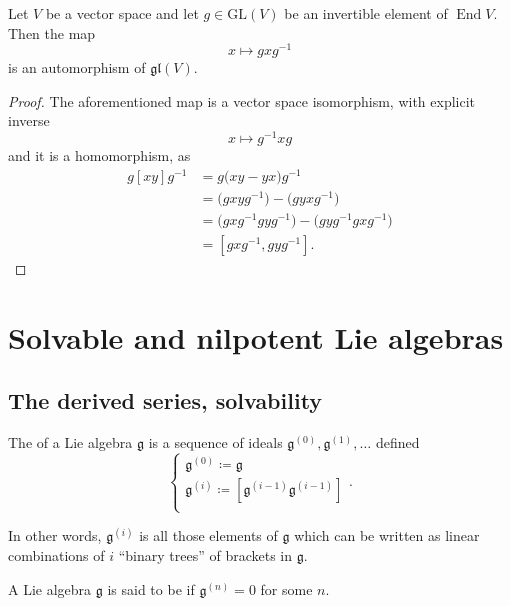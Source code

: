 \documentclass{article}
\newcommand{\lb}[1]{\ensuremath{\left[{#1}\right]}}
\DeclareMathOperator{\End}{End}
\newcommand{\frkg}{\ensuremath{\mathfrak{g}}}
\newcommand{\GL}{\ensuremath{\text{GL}}}
\newcommand{\glalg}{\ensuremath{\mathfrak{gl}}}
\begin{document}
\begin{proposition}
    Let $V$ be a vector space and let $g \in \GL(V)$ be an invertible element of $\End V$.
    Then the map
    \[
        x \mapsto gxg^{-1}
    \]
    is an automorphism of $\glalg(V)$.
\end{proposition}
\begin{proof}
    The aforementioned map is a vector space isomorphism, with explicit inverse
    \[
        x \mapsto g^{-1}xg
    \]
    and it is a homomorphism, as
    \begin{align*}
        g\lb{xy}g^{-1}
        &=
        g\Big(xy - yx\Big)g^{-1}
        \\
        &=
        \Big(gxyg^{-1}\Big)
        -
        \Big(gyxg^{-1}\Big)
        \\
        &=
        \Big(gxg^{-1}gyg^{-1}\Big)
        -
        \Big(gyg^{-1}gxg^{-1}\Big)
        \\
        &=
        \lb{gxg^{-1},gyg^{-1}}.
    \end{align*}
\end{proof}

\section{Solvable and nilpotent Lie algebras}

\subsection{The derived series, solvability}

\begin{definition}
    The  of a Lie algebra $\frkg$ is a sequence of ideals $\frkg^{(0)}, \frkg^{(1)}, \ldots$ defined
    \[
        \begin{cases}
            \frkg^{(0)} \coloneq \frkg \\
            \frkg^{(i)} \coloneq \lb{\frkg^{(i-1)}\frkg^{(i-1)}} \\
        \end{cases}.
    \]
\end{definition}

In other words, $\frkg^{(i)}$ is all those elements of $\frkg$ which can be written as linear combinations of $i$ ``binary trees'' of brackets in $\frkg$.

\begin{definition}
    A Lie algebra $\frkg$ is said to be  if $\frkg^{(n)} = 0$ for some $n$.
\end{definition}
\end{document}
